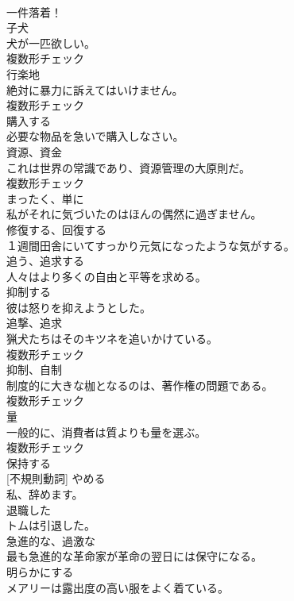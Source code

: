 \documentclass[8pt]{extreport}
\begin{document}
\begin{CJK}{UTF8}{min}
\\	一件落着！	
\\	[名詞]	子犬	
\\	犬が一匹欲しい。	
\\	複数形チェック
\\	[名詞]	行楽地	
\\	絶対に暴力に訴えてはいけません。	
\\	複数形チェック
\\	[動詞]	購入する	
\\	必要な物品を急いで購入しなさい。	
\\	[名詞]	資源、資金	
\\	これは世界の常識であり、資源管理の大原則だ。	
\\	複数形チェック
\\	[副詞]	まったく、単に	
\\	私がそれに気づいたのはほんの偶然に過ぎません。	
\\	[動詞]	修復する、回復する	
\\	１週間田舎にいてすっかり元気になったような気がする。	
\\	[動詞]	追う、追求する	
\\	人々はより多くの自由と平等を求める。	
\\	[動詞]	抑制する	
\\	彼は怒りを抑えようとした。	
\\	[名詞]	追撃、追求	
\\	猟犬たちはそのキツネを追いかけている。	
\\	複数形チェック
\\	[名詞]	抑制、自制	
\\	制度的に大きな枷となるのは、著作権の問題である。	
\\	複数形チェック
\\	[名詞]	量	
\\	一般的に、消費者は質よりも量を選ぶ。	
\\	複数形チェック
\\	[動詞]	保持する	
\\	[動詞] [不規則動詞]	やめる	
\\	私、辞めます。	
\\	[形容詞]	退職した	
\\	トムは引退した。	
\\	[形容詞]	急進的な、過激な	
\\	最も急進的な革命家が革命の翌日には保守になる。	
\\	[動詞]	明らかにする	
\\	メアリーは露出度の高い服をよく着ている。	

\end{CJK}
\end{document}
